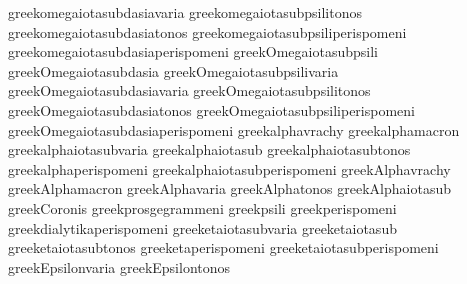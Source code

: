  greekomegaiotasubdasiavaria         {}
 greekomegaiotasubpsilitonos         {}
 greekomegaiotasubdasiatonos         {}
 greekomegaiotasubpsiliperispomeni   {}
 greekomegaiotasubdasiaperispomeni   {}
 greekOmegaiotasubpsili              {}
 greekOmegaiotasubdasia              {}
 greekOmegaiotasubpsilivaria         {}
 greekOmegaiotasubdasiavaria         {}
 greekOmegaiotasubpsilitonos         {}
 greekOmegaiotasubdasiatonos         {}
 greekOmegaiotasubpsiliperispomeni   {}
 greekOmegaiotasubdasiaperispomeni   {}
 greekalphavrachy                    {} %
 greekalphamacron                    {}
 greekalphaiotasubvaria              {}
 greekalphaiotasub                   {}
 greekalphaiotasubtonos              {}
 greekalphaperispomeni               {}
 greekalphaiotasubperispomeni        {}
 greekAlphavrachy                    {}
 greekAlphamacron                    {}
 greekAlphavaria                     {}
 greekAlphatonos                     {}
 greekAlphaiotasub                   {}
 greekCoronis                        {}
 greekprosgegrammeni                 {}
 greekpsili                          {}
 greekperispomeni                    {} %
 greekdialytikaperispomeni           {}
 greeketaiotasubvaria                {}
 greeketaiotasub                     {}
 greeketaiotasubtonos                {}
 greeketaperispomeni                 {}
 greeketaiotasubperispomeni          {}
 greekEpsilonvaria                   {}
 greekEpsilontonos                   {}
